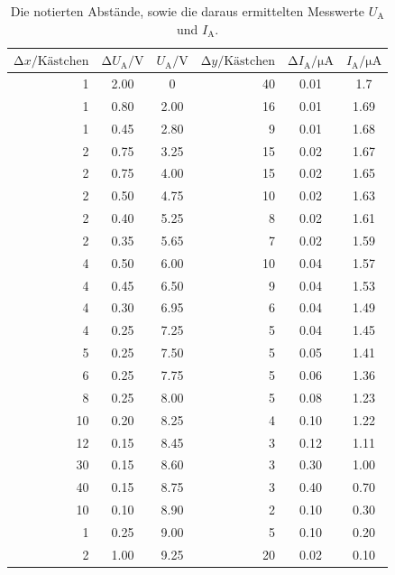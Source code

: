 \begin{table}
    \centering
    \caption{Die notierten Abstände, sowie die daraus ermittelten Messwerte $U_\text{A}$ und $I_\text{A}$.}
    \label{tab:Steigungsdreiecke}
    \begin{tabular}{r c c r c c}
    \toprule
    $\increment x /\text{Kästchen}$ & $\increment U_\text{A} / \si{\volt}$&  $ U_\text{A} / \si{\volt}$ & $\increment y / \text{Kästchen}$ & $\increment I_\text{A} / \si{\micro\ampere}$ & $I_\text{A} / \si{\micro\ampere}$\\
    \midrule
        1  & 2.00  & 0     &  40 & 0.01 & 1.7 \\
        1  & 0.80  & 2.00  &  16 & 0.01 & 1.69\\
        1  & 0.45  & 2.80  &   9 & 0.01 & 1.68\\
        2  & 0.75  & 3.25  &  15 & 0.02 & 1.67\\
        2  & 0.75  & 4.00  &  15 & 0.02 & 1.65\\
        2  & 0.50  & 4.75  &  10 & 0.02 & 1.63\\
        2  & 0.40  & 5.25  &   8 & 0.02 & 1.61\\
        2  & 0.35  & 5.65  &   7 & 0.02 & 1.59\\
        4  & 0.50  & 6.00  &  10 & 0.04 & 1.57\\
        4  & 0.45  & 6.50  &   9 & 0.04 & 1.53\\
        4  & 0.30  & 6.95  &   6 & 0.04 & 1.49\\
        4  & 0.25  & 7.25  &   5 & 0.04 & 1.45\\
        5  & 0.25  & 7.50  &   5 & 0.05 & 1.41\\
        6  & 0.25  & 7.75  &   5 & 0.06 & 1.36\\
        8  & 0.25  & 8.00  &   5 & 0.08 & 1.23\\
        10 & 0.20  & 8.25  &   4 & 0.10 & 1.22\\
        12 & 0.15  & 8.45  &   3 & 0.12 & 1.11\\  
        30 & 0.15  & 8.60  &   3 & 0.30 & 1.00\\
        40 & 0.15  & 8.75  &   3 & 0.40 & 0.70\\
        10 & 0.10  & 8.90  &   2 & 0.10 & 0.30\\ 
        1  & 0.25  & 9.00  &   5 & 0.10 & 0.20\\
        2  & 1.00  & 9.25  &  20 & 0.02 & 0.10\\
    \bottomrule
    \end{tabular}
\end{table}

